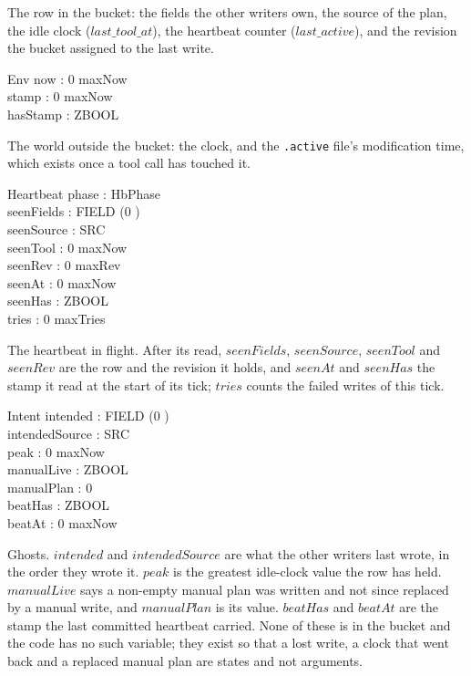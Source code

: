 \documentclass[a4paper,10pt,fleqn]{article}
\begin{document}
The row in the bucket: the fields the other writers own, the source of the
plan, the idle clock ($last\_tool\_at$), the heartbeat counter
($last\_active$), and the revision the bucket assigned to the last write.

\begin{schema}{Env}
  now : 0 \upto maxNow \\
  stamp : 0 \upto maxNow \\
  hasStamp : ZBOOL
\end{schema}

The world outside the bucket: the clock, and the \texttt{.active} file's
modification time, which exists once a tool call has touched it.

\begin{schema}{Heartbeat}
  phase : HbPhase \\
  seenFields : FIELD \fun (0 ) \\
  seenSource : SRC \\
  seenTool : 0 \upto maxNow \\
  seenRev : 0 \upto maxRev \\
  seenAt : 0 \upto maxNow \\
  seenHas : ZBOOL \\
  tries : 0 \upto maxTries
\end{schema}

The heartbeat in flight.  After its read, $seenFields$, $seenSource$,
$seenTool$ and $seenRev$ are the row and the revision it holds, and $seenAt$
and $seenHas$ the stamp it read at the start of its tick; $tries$ counts the
failed writes of this tick.

\begin{schema}{Intent}
  intended : FIELD \fun (0 ) \\
  intendedSource : SRC \\
  peak : 0 \upto maxNow \\
  manualLive : ZBOOL \\
  manualPlan : 0  \\
  beatHas : ZBOOL \\
  beatAt : 0 \upto maxNow
\end{schema}

Ghosts.  $intended$ and $intendedSource$ are what the other writers last wrote,
in the order they wrote it.  $peak$ is the greatest idle-clock value the row
has held.  $manualLive$ says a non-empty manual plan was written and not since
replaced by a manual write, and $manualPlan$ is its value.  $beatHas$ and
$beatAt$ are the stamp the last committed heartbeat carried.  None of these is
in the bucket and the code has no such variable; they exist so that a lost
write, a clock that went back and a replaced manual plan are states and not
arguments.
\end{document}
